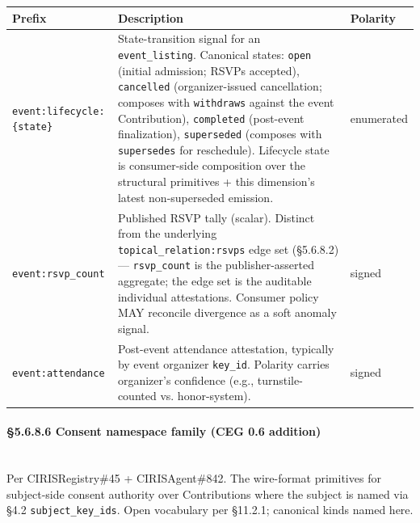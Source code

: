 \documentclass[11pt]{article}
\begin{document}
{\footnotesize
\begin{longtable}{|p{5.33cm}|p{5.33cm}|p{5.33cm}|}\hline
\textbf{Prefix} & \textbf{Description} & \textbf{Polarity} \\ \hline\endhead
\texttt{event:lifecycle:\{state\}} & State-transition signal for an \texttt{event\_listing}. Canonical states: \texttt{open} (initial admission; RSVPs accepted), \texttt{cancelled} (organizer-issued cancellation; composes with \texttt{withdraws} against the event Contribution), \texttt{completed} (post-event finalization), \texttt{superseded} (composes with \texttt{supersedes} for reschedule). Lifecycle state is consumer-side composition over the structural primitives + this dimension's latest non-superseded emission. & enumerated \\ \hline
\texttt{event:rsvp\_count} & Published RSVP tally (scalar). Distinct from the underlying \texttt{topical\_relation:rsvps} edge set (§5.6.8.2) — \texttt{rsvp\_count} is the publisher-asserted aggregate; the edge set is the auditable individual attestations. Consumer policy MAY reconcile divergence as a soft anomaly signal. & signed \\ \hline
\texttt{event:attendance} & Post-event attendance attestation, typically by event organizer \texttt{key\_id}. Polarity carries organizer's confidence (e.g., turnstile-counted vs. honor-system). & signed \\ \hline
\end{longtable}}



\paragraph{§5.6.8.6 Consent namespace family (CEG 0.6 addition)}\mbox{}\\


Per CIRISRegistry\#45 + CIRISAgent\#842. The wire-format primitives for subject-side consent authority over Contributions where the subject is named via §4.2 \texttt{subject\_key\_ids}. Open vocabulary per §11.2.1; canonical kinds named here.
\end{document}
